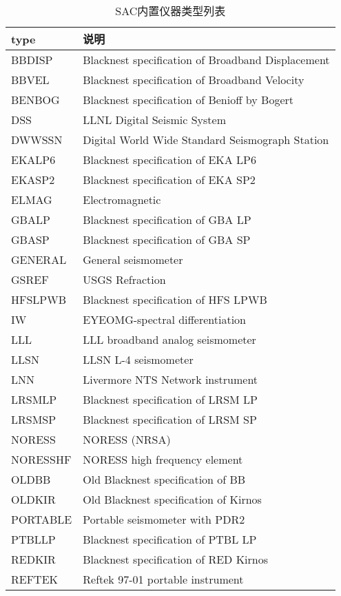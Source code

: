 \begin{table}[tp]
\centering
\ttfamily
\small
\caption{SAC内置仪器类型列表}
\label{table:instrument-type}
\begin{tabular}{ll}
\toprule
type	 &	说明	\\
\midrule
BBDISP   &  Blacknest specification of Broadband Displacement \\
BBVEL    &  Blacknest specification of Broadband Velocity	\\
BENBOG   &  Blacknest specification of Benioff by Bogert	\\
DSS      &  LLNL Digital Seismic System	\\
DWWSSN   &  Digital World Wide Standard Seismograph Station	\\
EKALP6   &  Blacknest specification of EKA LP6	\\
EKASP2   &  Blacknest specification of EKA SP2	\\
ELMAG    &  Electromagnetic	\\
GBALP    &  Blacknest specification of GBA LP	\\
GBASP    &  Blacknest specification of GBA SP	\\
GENERAL  &  General seismometer	\\
GSREF    &  USGS Refraction	\\
HFSLPWB  &  Blacknest specification of HFS LPWB	\\
IW       &  EYEOMG-spectral differentiation	\\
LLL      &  LLL broadband analog seismometer	\\
LLSN     &  LLSN L-4 seismometer	\\
LNN      &  Livermore NTS Network instrument	\\
LRSMLP   &  Blacknest specification of LRSM LP	\\
LRSMSP   &  Blacknest specification of LRSM SP	\\
NORESS   &  NORESS (NRSA)	\\
NORESSHF &  NORESS high frequency element	\\
OLDBB    &  Old Blacknest specification of BB	\\
OLDKIR   &  Old Blacknest specification of Kirnos	\\
PORTABLE &  Portable seismometer with PDR2	\\
PTBLLP   &  Blacknest specification of PTBL LP	\\
REDKIR   &  Blacknest specification of RED Kirnos	\\
REFTEK   &  Reftek 97-01 portable instrument	\\

\end{tabular}
\end{table}
